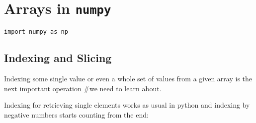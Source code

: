 \documentclass[numpymain.tex]{subfiles}
\begin{document}
\section{Arrays in \texttt{numpy} }


\begin{framed}
\begin{verbatim}
import numpy as np
\end{verbatim}
\end{framed}

\subsection{Indexing and Slicing}
Indexing some single value or even a whole set of values from a given array is the next important operation #we need to learn about.

Indexing for retrieving single elements works as usual in python and indexing by negative numbers starts 
counting from the end:
\end{document}
